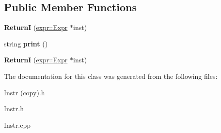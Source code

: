 \subsection*{Public Member Functions}
\begin{DoxyCompactItemize}
\item 
\mbox{\label{classspan_1_1ir_1_1instr_1_1ReturnI_a00200fd821eaaba58d11086181feec45}} 
{\bfseries ReturnI} (\hyperlink{classspan_1_1ir_1_1expr_1_1Expr}{expr\+::\+Expr} $\ast$inst)
\item 
\mbox{\label{classspan_1_1ir_1_1instr_1_1ReturnI_a14195daefce06ae78a4b7a1ecbacfa37}} 
string {\bfseries print} ()
\item 
\mbox{\label{classspan_1_1ir_1_1instr_1_1ReturnI_a1964d4c5bfcf3ea663309406bc343bcb}} 
{\bfseries ReturnI} (\hyperlink{classspan_1_1ir_1_1expr_1_1Expr}{expr\+::\+Expr} $\ast$inst)
\end{DoxyCompactItemize}


The documentation for this class was generated from the following files\+:\begin{DoxyCompactItemize}
\item 
Instr (copy).\+h\item 
Instr.\+h\item 
Instr.\+cpp\end{DoxyCompactItemize}
